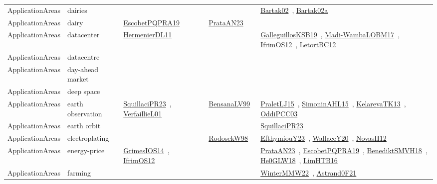 {\begin{longtable}{lp{3cm}>{\raggedright\arraybackslash}p{6cm}>{\raggedright\arraybackslash}p{6cm}>{\raggedright\arraybackslash}p{8cm}}
ApplicationAreas & dairies &  &  & \href{papers/Bartak02.pdf}{Bartak02}~\cite{Bartak02}, \href{papers/Bartak02a.pdf}{Bartak02a}~\cite{Bartak02a}\\
ApplicationAreas & dairy & \href{articles/EscobetPQPRA19.pdf}{EscobetPQPRA19}~\cite{EscobetPQPRA19} & \href{articles/PrataAN23.pdf}{PrataAN23}~\cite{PrataAN23} & \\
ApplicationAreas & datacenter & \href{papers/HermenierDL11.pdf}{HermenierDL11}~\cite{HermenierDL11} &  & \href{papers/GalleguillosKSB19.pdf}{GalleguillosKSB19}~\cite{GalleguillosKSB19}, \href{papers/Madi-WambaLOBM17.pdf}{Madi-WambaLOBM17}~\cite{Madi-WambaLOBM17}, \href{papers/IfrimOS12.pdf}{IfrimOS12}~\cite{IfrimOS12}, \href{papers/LetortBC12.pdf}{LetortBC12}~\cite{LetortBC12}\\
ApplicationAreas & datacentre &  &  & \\
ApplicationAreas & day-ahead market &  &  & \\
ApplicationAreas & deep space &  &  & \\
ApplicationAreas & earth observation & \href{papers/SquillaciPR23.pdf}{SquillaciPR23}~\cite{SquillaciPR23}, \href{papers/VerfaillieL01.pdf}{VerfaillieL01}~\cite{VerfaillieL01} & \href{articles/BensanaLV99.pdf}{BensanaLV99}~\cite{BensanaLV99} & \href{papers/PraletLJ15.pdf}{PraletLJ15}~\cite{PraletLJ15}, \href{articles/SimoninAHL15.pdf}{SimoninAHL15}~\cite{SimoninAHL15}, \href{papers/KelarevaTK13.pdf}{KelarevaTK13}~\cite{KelarevaTK13}, \href{papers/OddiPCC03.pdf}{OddiPCC03}~\cite{OddiPCC03}\\
ApplicationAreas & earth orbit &  &  & \href{papers/SquillaciPR23.pdf}{SquillaciPR23}~\cite{SquillaciPR23}\\
ApplicationAreas & electroplating &  & \href{papers/RodosekW98.pdf}{RodosekW98}~\cite{RodosekW98} & \href{papers/EfthymiouY23.pdf}{EfthymiouY23}~\cite{EfthymiouY23}, \href{articles/WallaceY20.pdf}{WallaceY20}~\cite{WallaceY20}, \href{articles/NovasH12.pdf}{NovasH12}~\cite{NovasH12}\\
ApplicationAreas & energy-price & \href{articles/GrimesIOS14.pdf}{GrimesIOS14}~\cite{GrimesIOS14}, \href{papers/IfrimOS12.pdf}{IfrimOS12}~\cite{IfrimOS12} &  & \href{articles/PrataAN23.pdf}{PrataAN23}~\cite{PrataAN23}, \href{articles/EscobetPQPRA19.pdf}{EscobetPQPRA19}~\cite{EscobetPQPRA19}, \href{papers/BenediktSMVH18.pdf}{BenediktSMVH18}~\cite{BenediktSMVH18}, \href{papers/He0GLW18.pdf}{He0GLW18}~\cite{He0GLW18}, \href{papers/LimHTB16.pdf}{LimHTB16}~\cite{LimHTB16}\\
ApplicationAreas & farming &  &  & \href{papers/WinterMMW22.pdf}{WinterMMW22}~\cite{WinterMMW22}, \href{papers/Astrand0F21.pdf}{Astrand0F21}~\cite{Astrand0F21}\\

\end{longtable}}
